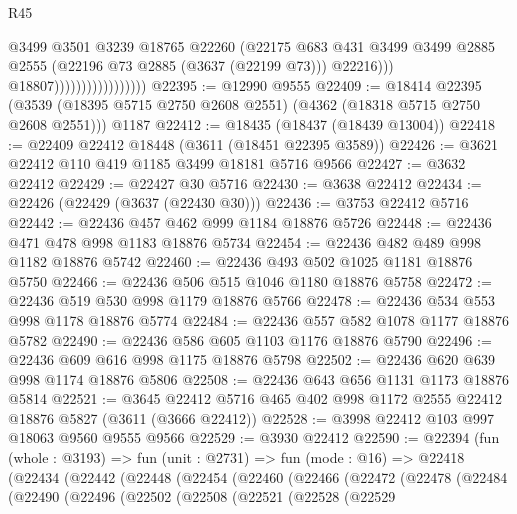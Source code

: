 \begin{lexlean}{R45}
\begin{coremodule}
                                          @3499
                                          @3501
                                          @3239
                                          @18765
                                          @22260
                                          (@22175
                                            @683
                                            @431
                                            @3499
                                            @3499
                                            @2885
                                            @2555
                                            (@22196 @73 @2885 (@3637 (@22199 @73)))
                                            @22216)))
                                      @18807)))))))))))))))))
@22395 := @12990 @9555
@22409 := @18414
    @22395
    (@3539 (@18395 @5715 @2750 @2608 @2551) (@4362 (@18318 @5715 @2750 @2608 @2551)))
    @1187
@22412 := @18435 (@18437 (@18439 @13004))
@22418 := @22409 @22412 @18448 (@3611 (@18451 @22395 @3589))
@22426 := @3621 @22412 @110 @419 @1185 @3499 @18181 @5716 @9566
@22427 := @3632 @22412
@22429 := @22427 @30 @5716
@22430 := @3638 @22412
@22434 := @22426 (@22429 (@3637 (@22430 @30)))
@22436 := @3753 @22412 @5716
@22442 := @22436 @457 @462 @999 @1184 @18876 @5726
@22448 := @22436 @471 @478 @998 @1183 @18876 @5734
@22454 := @22436 @482 @489 @998 @1182 @18876 @5742
@22460 := @22436 @493 @502 @1025 @1181 @18876 @5750
@22466 := @22436 @506 @515 @1046 @1180 @18876 @5758
@22472 := @22436 @519 @530 @998 @1179 @18876 @5766
@22478 := @22436 @534 @553 @998 @1178 @18876 @5774
@22484 := @22436 @557 @582 @1078 @1177 @18876 @5782
@22490 := @22436 @586 @605 @1103 @1176 @18876 @5790
@22496 := @22436 @609 @616 @998 @1175 @18876 @5798
@22502 := @22436 @620 @639 @998 @1174 @18876 @5806
@22508 := @22436 @643 @656 @1131 @1173 @18876 @5814
@22521 := @3645 @22412 @5716 @465 @402 @998 @1172 @2555 @22412 @18876 @5827 (@3611 (@3666 @22412))
@22528 := @3998 @22412 @103 @997 @18063 @9560 @9555 @9566
@22529 := @3930 @22412
@22590 := @22394
    (fun (whole : @3193) =>
    fun (unit : @2731) =>
    fun (mode : @16) =>
    @22418
      (@22434
        (@22442
          (@22448
            (@22454
              (@22460
                (@22466
                  (@22472
                    (@22478
                      (@22484
                        (@22490
                          (@22496
                            (@22502
                              (@22508
                                (@22521
                                  (@22528
                                    (@22529

\end{coremodule}
\end{lexlean}
